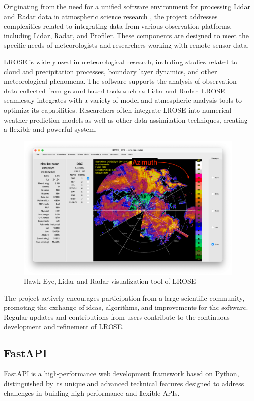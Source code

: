 Originating from the need for a unified software environment for processing Lidar and Radar data in atmospheric science research \cite{lrose}, the project addresses complexities related to integrating data from various observation platforms, including Lidar, Radar, and Profiler. These components are designed to meet the specific needs of meteorologists and researchers working with remote sensor data.

LROSE is widely used in meteorological research, including studies related to cloud and precipitation processes, boundary layer dynamics, and other meteorological phenomena. The software supports the analysis of observation data collected from ground-based tools such as Lidar and Radar. LROSE seamlessly integrates with a variety of model and atmospheric analysis tools to optimize its capabilities. Researchers often integrate LROSE into numerical weather prediction models as well as other data assimilation techniques, creating a flexible and powerful system.

\begin{figure}[H]
    \centering
    \includegraphics[width=0.8\linewidth]{Images/3.5-hawk-eye.png}
    \caption{Hawk Eye, Lidar and Radar visualization tool of LROSE}
    \label{fig:hawk-eye}
\end{figure}

The project actively encourages participation from a large scientific community, promoting the exchange of ideas, algorithms, and improvements for the software. Regular updates and contributions from users contribute to the continuous development and refinement of LROSE.

\subsection{FastAPI}
FastAPI is a high-performance web development framework based on Python, distinguished by its unique and advanced technical features designed to address challenges in building high-performance and flexible APIs.

